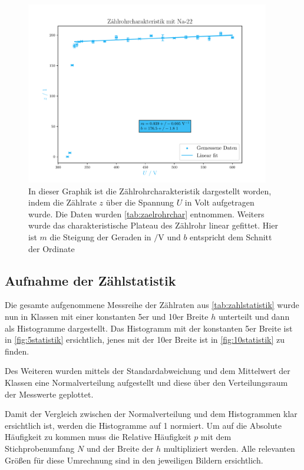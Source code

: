 \documentclass[12pt,english,ngerman]{scrartcl}
\begin{document}
\begin{figure}[H]
	\begin{center}
		\includegraphics[width = 0.95\textwidth]{figures/charakteristik.pdf}
	\end{center}
	\caption[Aufnahme der Zählrohrcharakteristik bei  Probe mit
		linearem Fit]{In dieser Graphik ist die Zählrohrcharakteristik dargestellt
		worden, indem die Zählrate $z$ über die Spannung $U$
		in Volt aufgetragen wurde. Die
		Daten wurden \autoref{tab:zaelrohrchar} entnommen. Weiters wurde das
		charakteristische Plateau des Zählrohr linear gefittet. Hier ist $m$ die
		Steigung der Geraden in $\si{\per\volt}$
		und $b$ entspricht dem Schnitt der Ordinate}\label{fig:zaelrohrchar}
\end{figure}

\subsection{Aufnahme der Zählstatistik}

Die gesamte aufgenommene Messreihe der Zählraten aus
\autoref{tab:zahlstatistik} wurde nun in Klassen mit einer konstanten 5er und
10er Breite $h$ unterteilt und dann als Histogramme dargestellt. Das Histogramm
mit der konstanten 5er Breite ist in \autoref{fig:5statistik} ersichtlich,
jenes mit der 10er Breite ist in \autoref{fig:10statistik} zu finden.

Des Weiteren wurden mittels der Standardabweichung und dem Mittelwert der
Klassen eine Normalverteilung aufgestellt und diese über den Verteilungsraum
der Messwerte geplottet.

Damit der Vergleich zwischen der Normalverteilung und dem Histogrammen klar
ersichtlich ist, werden die Histogramme auf 1 normiert. Um auf die Absolute
Häufigkeit zu kommen muss die Relative Häufigkeit $p$ mit dem Stichprobenumfang
$N$ und der Breite der $h$ multipliziert werden. Alle relevanten Größen für
diese Umrechnung sind in den jeweiligen Bildern ersichtlich.
\end{document}
